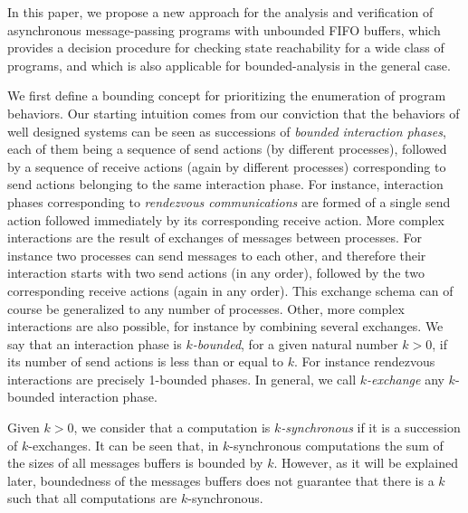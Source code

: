 In this paper, we propose a new approach for the analysis and verification of asynchronous message-passing programs with unbounded FIFO buffers, which provides a decision procedure for checking state reachability for a wide class of programs, and which is also applicable for bounded-analysis in the general case. 

We first define a bounding concept for prioritizing the enumeration of program behaviors. %
Our starting intuition comes from our conviction that the behaviors of well designed systems can be seen as successions of {\em bounded interaction phases}, each of them being a sequence of send actions (by different processes), followed by a sequence of receive actions (again by different processes) corresponding to send actions belonging to the same interaction phase. For instance, interaction phases corresponding to {\em rendezvous communications} are formed of a single send action followed immediately by its corresponding receive action. More complex interactions are the result of exchanges of messages between processes. For instance two processes can send messages to each other, and therefore their interaction starts with two send actions (in any order), followed by the two corresponding receive actions (again in any order). This exchange schema can of course be generalized to any number of processes. Other, more complex interactions are also possible, for instance by combining several exchanges. We say that an interaction phase is {\em $k$-bounded}, for a given natural number $k > 0$, if its number of send actions is less than or equal to $k$. For instance rendezvous interactions are precisely 1-bounded phases.  In general, we call {\em $k$-exchange} any $k$-bounded interaction phase. 

Given $k > 0$, we consider that a computation is {\em $k$-synchronous} if it is a succession of $k$-exchanges.
It can be seen that, in $k$-synchronous computations the sum of the sizes of all messages buffers is bounded by $k$. However, as it will be explained later, boundedness of the messages buffers does not guarantee that there is a $k$ such that all computations are $k$-synchronous. 

